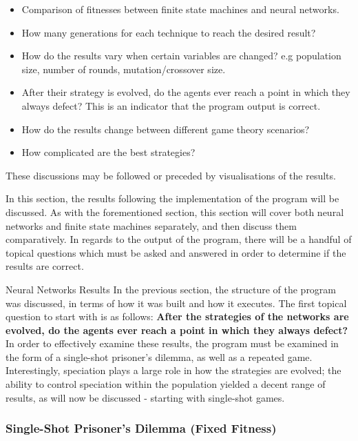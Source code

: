 \documentclass[12pt,a4paper]{article}
\makeatletter
\renewcommand\subsection{\@startsection {subsection}{1}{2mm}
                               {3pt plus 2pt minus 1pt}
                               {3pt plus 0pt}
                               {\normalfont\bfseries}}
\makeatother
\begin{document}
\begin{itemize}
  \item Comparison of fitnesses between finite state machines and neural networks.
  \item How many generations for each technique to reach the desired result?
  \item How do the results vary when certain variables are changed? e.g population size, number of rounds, mutation/crossover size.
  \item After their strategy is evolved, do the agents ever reach a point in which they always defect? This is an indicator that the program output is correct.
  \item How do the results change between different game theory scenarios?
  \item How complicated are the best strategies?
\end{itemize}

These discussions may be followed or preceded by visualisations of the results.
\fi

In this section, the results following the implementation of the program will be discussed. As with the forementioned section, this section will cover both neural networks and finite state machines separately, and then discuss them comparatively. In regards to the output of the program, there will be a handful of topical questions which must be asked and answered in order to determine if the results are correct.

\subsection{Neural Networks Results}
In the previous section, the structure of the program was discussed, in terms of how it was built and how it executes. The first topical question to start with is as follows: \textbf{After the strategies of the networks are evolved, do the agents ever reach a point in which they always defect?} In order to effectively examine these results, the program must be examined in the form of a single-shot prisoner's dilemma, as well as a repeated game. Interestingly, speciation plays a large role in how the strategies are evolved; the ability to control speciation within the population yielded a decent range of results, as will now be discussed - starting with single-shot games.

\subsubsection{Single-Shot Prisoner's Dilemma (Fixed Fitness)}
\end{document}
